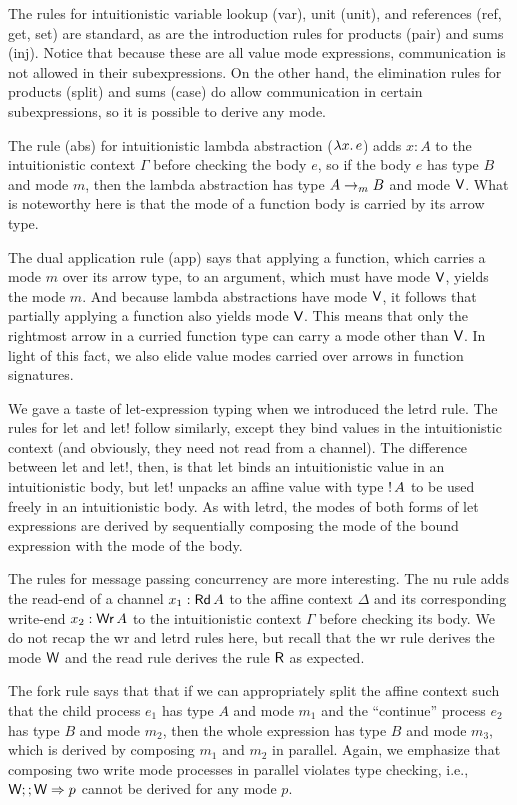 The rules for intuitionistic variable lookup (var), unit (unit), and references
(ref, get, set) are standard, as are the introduction rules for products (pair)
and sums (inj). Notice that because these are all value mode expressions,
communication is not allowed in their subexpressions. On the other hand, the
elimination rules for products (split) and sums (case) do allow communication in
certain subexpressions, so it is possible to derive any mode.

The rule (abs) for intuitionistic lambda abstraction ($\lambda{x}.\,{e}$) adds $x:A$
to the intuitionistic context $\Gamma$ before checking the body $e$, so if the body
$e$ has type $B$ and mode $m$, then the lambda abstraction has type
${A}\rightarrow_{\footnotesize m}{B}$ and mode $\textsf{V}$. What is noteworthy here is that
the mode of a function body is carried by its arrow type.

The dual application rule (app) says that applying a function, which carries a
mode $m$ over its arrow type, to an argument, which must have mode $\textsf{V}$, yields
the mode $m$. And because lambda abstractions have mode $\textsf{V}$, it follows that
partially applying a function also yields mode $\textsf{V}$. This means that only the
rightmost arrow in a curried function type can carry a mode other than $\textsf{V}$. In
light of this fact, we also elide value modes carried over arrows in function
signatures.

We gave a taste of let-expression typing when we introduced the letrd rule. The
rules for let and let! follow similarly, except they bind values in the
intuitionistic context (and obviously, they need not read from a channel). The
difference between let and let!, then, is that let binds an intuitionistic value
in an intuitionistic body, but let! unpacks an affine value with type
${!}\,{A}$ to be used freely in an intuitionistic body. As with letrd, the
modes of both forms of let expressions are derived by sequentially composing the
mode of the bound expression with the mode of the body.

The rules for message passing concurrency are more interesting. The nu rule adds
the read-end of a channel $x_1: \text{\textsf{Rd}}\,A$ to the affine context $\Delta$ and its
corresponding write-end $x_2 : \text{\textsf{Wr}}\,A$ to the intuitionistic context $\Gamma$
before checking its body. We do not recap the wr and letrd rules here, but
recall that the wr rule derives the mode $\textsf{W}$ and the read rule derives the
rule $\textsf{R}$ as expected.

The fork rule says that that if we can appropriately split the affine context
such that the child process $e_1$ has type $A$ and mode $m_1$ and the
``continue'' process $e_2$ has type $B$ and mode $m_2$, then the whole
expression has type $B$ and mode $m_3$, which is derived by composing $m_1$ and
$m_2$ in parallel. Again, we emphasize that composing two write mode processes
in parallel violates type checking, i.e., $\textsf{W} ;; \textsf{W} => p$ cannot be derived
for any mode $p$.

